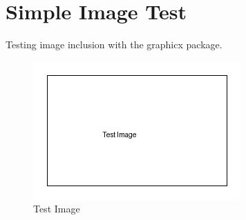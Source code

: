 \documentclass{article}
\begin{document}
\section{Simple Image Test}

Testing image inclusion with the graphicx package.

\begin{figure}[htbp]
    \centering
    \includegraphics{test_image.png}
    \caption{Test Image}
    \label{fig:test}
\end{figure}
\end{document}

